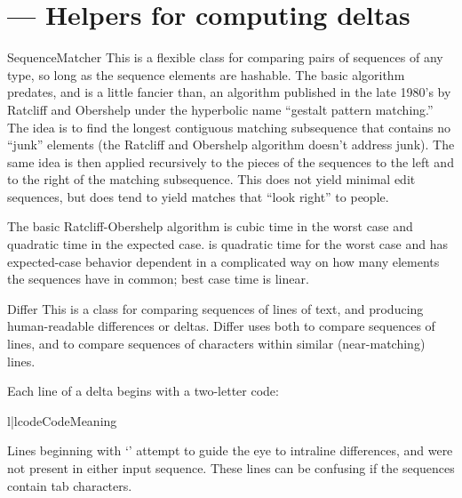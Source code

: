 \section{ ---
         Helpers for computing deltas}




\begin{classdesc*}{SequenceMatcher}
  This is a flexible class for comparing pairs of sequences of any
  type, so long as the sequence elements are hashable.  The basic
  algorithm predates, and is a little fancier than, an algorithm
  published in the late 1980's by Ratcliff and Obershelp under the
  hyperbolic name ``gestalt pattern matching.''  The idea is to find
  the longest contiguous matching subsequence that contains no
  ``junk'' elements (the Ratcliff and Obershelp algorithm doesn't
  address junk).  The same idea is then applied recursively to the
  pieces of the sequences to the left and to the right of the matching
  subsequence.  This does not yield minimal edit sequences, but does
  tend to yield matches that ``look right'' to people.

   The basic Ratcliff-Obershelp algorithm is cubic
  time in the worst case and quadratic time in the expected case.
   is quadratic time for the worst case and has
  expected-case behavior dependent in a complicated way on how many
  elements the sequences have in common; best case time is linear.
\end{classdesc*}

\begin{classdesc*}{Differ}
  This is a class for comparing sequences of lines of text, and
  producing human-readable differences or deltas.  Differ uses
   both to compare sequences of lines, and to
  compare sequences of characters within similar (near-matching)
  lines.

  Each line of a  delta begins with a two-letter code:

\begin{tableii}{l|l}{code}{Code}{Meaning}
\end{tableii}

  Lines beginning with `' attempt to guide the eye to
  intraline differences, and were not present in either input
  sequence. These lines can be confusing if the sequences contain tab
  characters.
\end{classdesc*}

